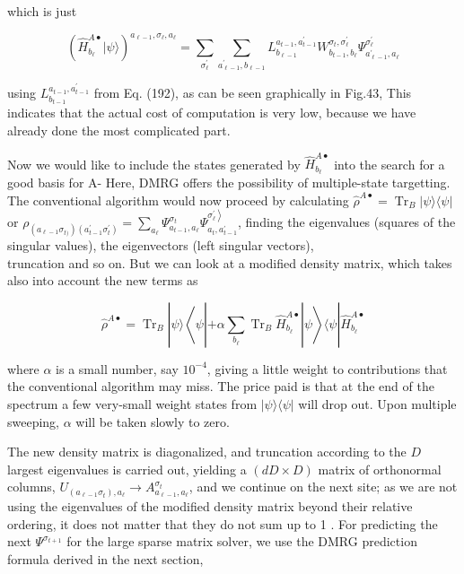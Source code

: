 \documentclass[12pt]{article}
\begin{document}
which is just


\begin{equation*}
\left(\hat{H}_{b_{\ell}}^{A \bullet}|\psi\rangle\right)^{a_{\ell-1}, \sigma_{\ell}, a_{\ell}}=\sum_{\sigma_{\ell}^{\prime}} \sum_{a_{\ell-1}^{\prime}, b_{\ell-1}} L_{b_{\ell-1}}^{a_{t-1}, a_{t-1}^{\prime}} W_{b_{t-1}, b_{\ell}}^{\sigma_{t}, \sigma_{\ell}^{\prime}} \Psi_{a_{\ell-1}^{\prime}, a_{\ell}}^{\sigma_{\ell}^{\prime}} \tag{216}
\end{equation*}


using $L_{b_{t-1}}^{a_{t-1}, a_{t-1}^{\prime}}$ from Eq. (192), as can be seen graphically in Fig.43, This indicates that the actual cost of computation is very low, because we have already done the most complicated part.

Now we would like to include the states generated by $\hat{H}_{b_{\ell}}^{A \bullet}$ into the search for a good basis for A- Here, DMRG offers the possibility of multiple-state targetting. The conventional algorithm would now proceed by calculating $\hat{\rho}^{A \bullet}=\operatorname{Tr}_{B}|\psi\rangle\langle\psi|$ or $\rho_{\left(a_{\ell-1} \sigma_{t)}\right)\left(a_{t-1}^{\prime} \sigma_{t}^{\prime}\right)}=\sum_{a_{\ell}} \Psi_{a_{t-1}, a_{\ell}}^{\sigma_{t}} \Psi_{a_{t}, a_{t-1}^{\prime}}^{\left.\sigma_{\ell}^{\prime}\right\rangle}$, finding the eigenvalues (squares of the singular values), the eigenvectors (left singular vectors),\\
truncation and so on. But we can look at a modified density matrix, which takes also into account the new terms as


\begin{equation*}
\hat{\rho}^{A \bullet}=\operatorname{Tr}_{B}|\psi\rangle\left\langle\psi\left|+\alpha \sum_{b_{\ell}} \operatorname{Tr}_{B} \hat{H}_{b_{\ell}}^{A \bullet}\right| \psi\right\rangle\langle\psi| \hat{H}_{b_{\ell}}^{A \bullet} \tag{217}
\end{equation*}


where $\alpha$ is a small number, say $10^{-4}$, giving a little weight to contributions that the conventional algorithm may miss. The price paid is that at the end of the spectrum a few very-small weight states from $|\psi\rangle\langle\psi|$ will drop out. Upon multiple sweeping, $\alpha$ will be taken slowly to zero.

The new density matrix is diagonalized, and truncation according to the $D$ largest eigenvalues is carried out, yielding a $(d D \times D)$ matrix of orthonormal columns, $U_{\left(a_{\ell-1} \sigma_{t}\right), a_{\ell}} \rightarrow A_{a_{\ell-1}, a_{\ell}}^{\sigma_{t}}$, and we continue on the next site; as we are not using the eigenvalues of the modified density matrix beyond their relative ordering, it does not matter that they do not sum up to 1 . For predicting the next $\Psi^{\sigma_{t+1}}$ for the large sparse matrix solver, we use the DMRG prediction formula derived in the next section,
\end{document}

